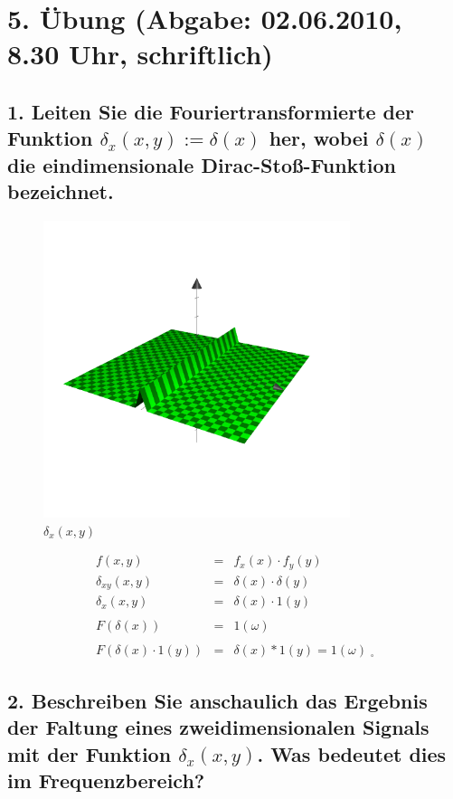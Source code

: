 \section*{5. \"Ubung (Abgabe: 02.06.2010, 8.30 Uhr, schriftlich)}

\subsection*{1. Leiten Sie die Fouriertransformierte der Funktion $\delta_{x}(x,y):=\delta(x)$ her, wobei $\delta(x)$ die eindimensionale Dirac-Sto{\ss}-Funktion bezeichnet.}
\begin{figure}[h] %
   \centering
   \includegraphics[width=0.8\textwidth]{Uebung5/5_1.pdf} 
   \caption{$\delta_{x}(x,y)$}
   \label{fig:5.1}
\end{figure}

\begin{eqnarray*}
f(x,y) & = & f_{x}(x)\cdot f_{y}(y) \\
\delta_{xy}(x,y) & = & \delta(x)\cdot\delta(y) \\
\delta_{x}(x,y) &=& \delta(x)\cdot 1(y) \\ \\
F(\delta(x)) &=& 1(\omega) \\ \\
F(\delta(x)\cdot 1(y)) &=& \delta(x) * 1(y) = 1(\omega) \; _{\square}
\end{eqnarray*}

\subsection*{2. Beschreiben Sie anschaulich das Ergebnis der Faltung eines zweidimensionalen Signals mit der Funktion $\delta_{x}(x,y)$. Was bedeutet dies im Frequenzbereich?}

